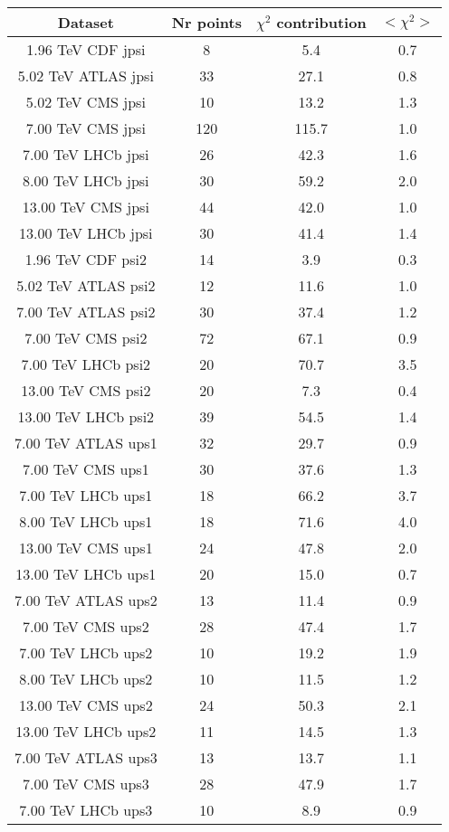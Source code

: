 \begin{table}[h!]
\centering
\begin{tabular}{c|c|c|c}
Dataset & Nr points & $\chi^2$ contribution & $<\chi^2>$ \\
\hline
1.96 TeV CDF jpsi & 8 & 5.4 & 0.7 \\
5.02 TeV ATLAS jpsi & 33 & 27.1 & 0.8 \\
5.02 TeV CMS jpsi & 10 & 13.2 & 1.3 \\
7.00 TeV CMS jpsi & 120 & 115.7 & 1.0 \\
7.00 TeV LHCb jpsi & 26 & 42.3 & 1.6 \\
8.00 TeV LHCb jpsi & 30 & 59.2 & 2.0 \\
13.00 TeV CMS jpsi & 44 & 42.0 & 1.0 \\
13.00 TeV LHCb jpsi & 30 & 41.4 & 1.4 \\
1.96 TeV CDF psi2 & 14 & 3.9 & 0.3 \\
5.02 TeV ATLAS psi2 & 12 & 11.6 & 1.0 \\
7.00 TeV ATLAS psi2 & 30 & 37.4 & 1.2 \\
7.00 TeV CMS psi2 & 72 & 67.1 & 0.9 \\
7.00 TeV LHCb psi2 & 20 & 70.7 & 3.5 \\
13.00 TeV CMS psi2 & 20 & 7.3 & 0.4 \\
13.00 TeV LHCb psi2 & 39 & 54.5 & 1.4 \\
7.00 TeV ATLAS ups1 & 32 & 29.7 & 0.9 \\
7.00 TeV CMS ups1 & 30 & 37.6 & 1.3 \\
7.00 TeV LHCb ups1 & 18 & 66.2 & 3.7 \\
8.00 TeV LHCb ups1 & 18 & 71.6 & 4.0 \\
13.00 TeV CMS ups1 & 24 & 47.8 & 2.0 \\
13.00 TeV LHCb ups1 & 20 & 15.0 & 0.7 \\
7.00 TeV ATLAS ups2 & 13 & 11.4 & 0.9 \\
7.00 TeV CMS ups2 & 28 & 47.4 & 1.7 \\
7.00 TeV LHCb ups2 & 10 & 19.2 & 1.9 \\
8.00 TeV LHCb ups2 & 10 & 11.5 & 1.2 \\
13.00 TeV CMS ups2 & 24 & 50.3 & 2.1 \\
13.00 TeV LHCb ups2 & 11 & 14.5 & 1.3 \\
7.00 TeV ATLAS ups3 & 13 & 13.7 & 1.1 \\
7.00 TeV CMS ups3 & 28 & 47.9 & 1.7 \\
7.00 TeV LHCb ups3 & 10 & 8.9 & 0.9 \\

\end{tabular}
\end{table}
